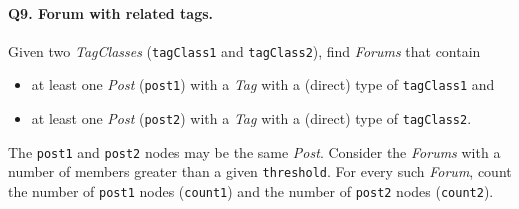 \paragraph{\textbf{Q9}. Forum with related tags.}
Given two \emph{TagClasses} (\texttt{tagClass1} and \texttt{tagClass2}),
find \emph{Forums} that contain
\begin{itemize}
\tightlist
\item
  at least one \emph{Post} (\texttt{post1}) with a \emph{Tag} with a
  (direct) type of \texttt{tagClass1} and
\item
  at least one \emph{Post} (\texttt{post2}) with a \emph{Tag} with a
  (direct) type of \texttt{tagClass2}.
\end{itemize}
The \texttt{post1} and \texttt{post2} nodes may be the same \emph{Post}.
Consider the \emph{Forums} with a number of members greater than a given
\texttt{threshold}. For every such \emph{Forum}, count the number of
\texttt{post1} nodes (\texttt{count1}) and the number of \texttt{post2}
nodes (\texttt{count2}).
